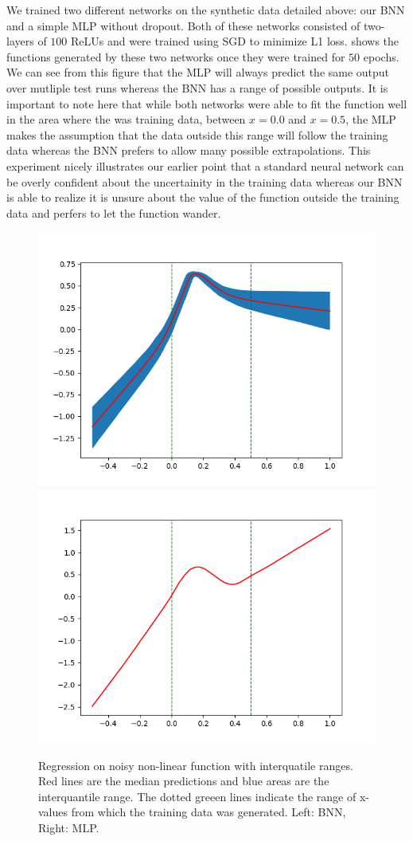 \documentclass[11pt]{article}
\begin{document}
We trained two different networks on the synthetic data detailed above: our BNN
and a simple MLP without dropout. Both of these networks consisted of
two-layers of $100$ ReLUs and were trained using SGD to minimize L1 loss.
 shows the functions generated by these two networks
once they were trained for $50$ epochs. We can see from this figure that the
MLP will always predict the same output over mutliple test runs whereas the BNN
has a range of possible outputs. It is important to note here that while both
networks were able to fit the function well in the area where the was training
data, between $x=0.0$ and $x=0.5$, the MLP makes the assumption that the data
outside this range will follow the training data whereas the BNN prefers to
allow many possible extrapolations. This experiment nicely illustrates our
earlier point that a standard neural network can be overly confident about the
uncertainity in the training data whereas our BNN is able to realize it is
unsure about the value of the function outside the training data and perfers to
let the function wander.

\begin{figure}
  \centering\includegraphics[width=.45\textwidth]{figures/reg_bnn_extended.png}
  \centering\includegraphics[width=.45\textwidth]{figures/reg_mlp_extended.png}
  \caption{Regression on noisy non-linear function with interquatile ranges.
  Red lines are the median predictions and blue areas are the interquantile range.
	The dotted greeen lines indicate the range of x-values from which the training
  data was generated.
  Left: BNN, Right: MLP.}
  \label{fig:reg_extended}
\end{figure}
\end{document}
